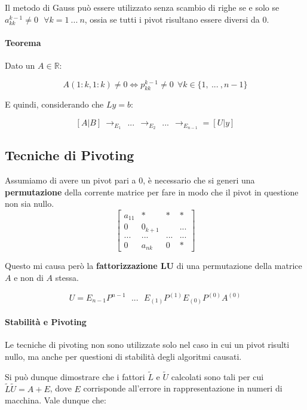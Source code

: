 \documentclass{article}
\begin{document}
\vspace*{10px}

Il metodo di Gauss può essere utilizzato senza scambio di \newline righe se e solo se
$a^{k-1}_{kk} \neq 0 \:\:\: \forall k = 1 \: ... \: n$, ossia se tutti i pivot risultano essere diversi da 0.

\paragraph{Teorema} Dato un $A \in \mathbb{R}$: 

\[ A(1:k,1:k) \neq 0  \Leftrightarrow p^{k-1}_{kk} \neq 0 \:\: \forall k \in \{ 1, \: ... \:, n-1  \} \]

E quindi, considerando che $Ly = b$:

\[ [A|B] \: \rightarrow_{E_{1}} \:\: ... \:\: \rightarrow_{E_{2}} \:\: ... \:\: \rightarrow_{E_{n-1}} = [U|y] \] 

\subsection{Tecniche di Pivoting}

Assumiamo di avere un pivot pari a $0$, è necessario che si generi una \textbf{permutazione}
della corrente matrice per fare in modo che il pivot in questione non sia nullo.
\[
    \begin{bmatrix}
    a_{11} & * & *  & * \\
    0 & 0_{k+1} &  & ...\\
     ...& ... & ... &  ...\\
     0 & a_{nk} & 0 & *
    \end{bmatrix}
\]

Questo mi causa però la \textbf{fattorizzazione LU} di una permutazione della matrice
$A$ e non di $A$ stessa.

\[ U = E_{n-1}P^{n-1} \:\:\: ... \:\:\: E_{(1)}P^{(1)}E_{(0)}P^{(0)}A^{(0)} \]

\paragraph{Stabilità e Pivoting} Le tecniche di pivoting non sono utilizzate solo
nel caso in cui un pivot risulti nullo, ma anche per questioni di stabilità degli
algoritmi causati.

Si può dunque dimostrare che i fattori $\tilde{L}$ e $\tilde{U}$ calcolati sono tali
per cui $\tilde{L} \tilde{U} = A + E $, dove $E$ corrisponde all'errore in rappresentazione
in numeri di macchina.
Vale dunque che:
\end{document}
